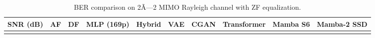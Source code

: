 \begin{longtable}[]{@{}
  >{\raggedright\arraybackslash}p{}
  >{\raggedright\arraybackslash}p{}
  >{\raggedright\arraybackslash}p{}
  >{\raggedright\arraybackslash}p{}
  >{\raggedright\arraybackslash}p{}
  >{\raggedright\arraybackslash}p{}
  >{\raggedright\arraybackslash}p{}
  >{\raggedright\arraybackslash}p{}
  >{\raggedright\arraybackslash}p{}
  >{\raggedright\arraybackslash}p{}@{}}
\caption{BER comparison on 2Ã—2 MIMO Rayleigh channel with ZF equalization.}\label{tbl:table4}\tabularnewline
\toprule\noalign{}
\begin{minipage}[b]{\linewidth}\raggedright
SNR (dB)
\end{minipage} & \begin{minipage}[b]{\linewidth}\raggedright
AF
\end{minipage} & \begin{minipage}[b]{\linewidth}\raggedright
DF
\end{minipage} & \begin{minipage}[b]{\linewidth}\raggedright
MLP (169p)
\end{minipage} & \begin{minipage}[b]{\linewidth}\raggedright
Hybrid
\end{minipage} & \begin{minipage}[b]{\linewidth}\raggedright
VAE
\end{minipage} & \begin{minipage}[b]{\linewidth}\raggedright
CGAN
\end{minipage} & \begin{minipage}[b]{\linewidth}\raggedright
Transformer
\end{minipage} & \begin{minipage}[b]{\linewidth}\raggedright
Mamba S6
\end{minipage} & \begin{minipage}[b]{\linewidth}\raggedright
Mamba-2 SSD
\end{minipage} \\
\midrule\noalign{}
\endfirsthead
\toprule\noalign{}
\begin{minipage}[b]{\linewidth}\raggedright

\end{minipage}
\end{longtable}
